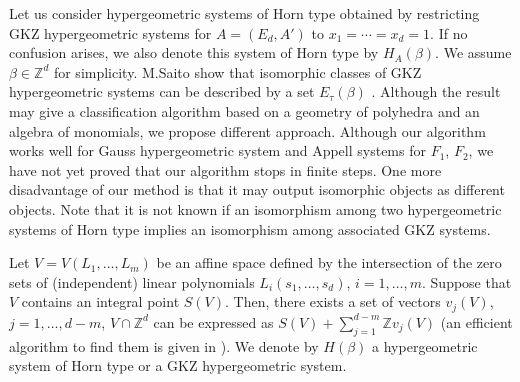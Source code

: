 \documentclass{article}
\def\ZZ{\mathbb{Z}}
\begin{document}
Let us consider hypergeometric systems of Horn type
obtained by restricting GKZ hypergeometric systems
for $A=(E_d,A')$ to $x_1=\cdots=x_d=1$.
If no confusion arises, we also denote this system of Horn type
by $H_A(\beta)$.
We assume $\beta \in \ZZ^d$ for simplicity.
M.Saito show that isomorphic classes of GKZ hypergeometric systems
can be described by a set $E_\tau(\beta)$ \cite{saito-isom}.
Although the result may give a classification algorithm based on a geometry of polyhedra and an algebra of monomials,
we propose different approach.
Although our algorithm works well for Gauss hypergeometric system
and Appell systems for $F_1$, $F_2$, we have not yet proved that our algorithm
stops in finite steps.
One more disadvantage of our method is that
it may output isomorphic objects as different objects.
Note that it is not known if an isomorphism among two hypergeometric systems
of Horn type
implies an isomorphism among associated GKZ systems.


Let $V=V(L_1, \ldots, L_m)$ be an affine space 
defined by the intersection of the zero sets of (independent) linear polynomials
$L_i(s_1, \ldots, s_d)$, $i=1, \ldots, m$.
Suppose that $V$ contains an integral point $S(V)$.
Then, there exists a set of vectors $v_j(V)$, $j=1, \ldots, d-m$,
$V \cap \ZZ^d$ can be expressed as $S(V)+\sum_{j=1}^{d-m} \ZZ v_j(V)$
(an efficient algorithm to find them is given in \cite{micciancio-2008}).
We denote by $H(\beta)$ 
a hypergeometric system of Horn type
or a GKZ hypergeometric system.
\end{document}
